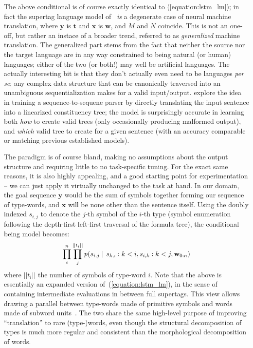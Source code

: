 The above conditional is of course exactly identical to (\ref{equation:lstm_lm}); in fact the supertag language model of~\citet{vaswani-etal-2016-supertagging} \textit{is} a degenerate case of neural machine translation, where $\mathbf{y}$ is $\mathbf{t}$ and $\mathbf{x}$ is $\mathbf{w}$, and $M$ and $N$ coincide.
This is not an one-off, but rather an instace of a broader trend, referred to as \textit{generalized} machine translation.
The generalized part stems from the fact that neither the source nor the target language are in any way constrained to being natural (or human) languages; either of the two (or both!) may well be artificial languages.
The actually interesting bit is that they don't actually even need to be languages \textit{per se}; any complex data structure that can be canonically traversed into an unambiguous sequentialization makes for a valid input/output.
\citet{vinyals2015grammar} explore the idea in training a sequence-to-sequene parser by directly translating the input sentence into a linearized constituency tree; the model is surprisingly accurate in learning both \textit{how} to create valid trees (only occasionally producing malformed output), and \textit{which} valid tree to create for a given sentence (with an accuracy comparable or matching previous established models).

The paradigm is of course bland, making no assumptions about the output structure and requiring little to no task-specific tuning.
For the exact same reasons, it is also highly appealing, and a good starting point for experimentation -- we can just apply it virtually unchanged to the task at hand.
In our domain, the goal sequence $\mathbf{y}$ would be the sum of symbols together forming our sequence of type-words, and $\mathbf{x}$ will be none other than the sentence itself.
Using the doubly indexed $s_{i,j}$ to denote the $j$-th symbol of the $i$-th type (symbol enumeration following the depth-first left-first traversal of the formula tree), the conditional being model becomes:
\begin{equation}
	\prod_i^n \prod_j^{|| t_i ||} 
	p(s_{i, j} \ | \ 
		s_{k, :} : k < i,
		s_{i, k} : k < j,
		\wseq)
\end{equation}
where $||t_i||$ the number of symbols of type-word $i$.
Note that the above is essentially an expanded version of~(\ref{equation:lstm_lm}), in the sense of containing intermediate evaluations in between full supertags.
This view allows drawing a parallel between type-words made of primitive symbols and words made of subword units~\cite{sennrich-etal-2016-neural}. The two share the same high-level purpose of improving ``translation'' to rare (type-)words, even though the structural decomposition of types is much more regular and consistent than the morphological decomposition of words.

